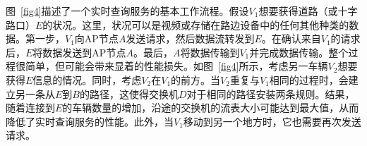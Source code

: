 
图~\ref{fig4}描述了一个实时查询服务的基本工作流程。假设$V_{1}$想要获得道路（或十字路口）$E$的状况。这里，状况可以是视频或存储在路边设备中的任何其他种类的数据。第一步，$V_{1}$向AP节点$A$发送请求，然后数据流转发到$E$。在确认来自$V_{1}$的请求后，$E$将数据发送到AP节点$A$。最后，$A$将数据传输到$V_{1}$并完成数据传输。整个过程很简单，但可能会带来显着的性能损失。如图~\ref{fig4}所示，考虑另一车辆$V_{2}$想要获得$E$信息的情况。同时，考虑$V_{2}$在$V_{1}$的前方。当$V_{2}$重复与$V_{1}$相同的过程时，会建立另一条从$E$到$B$的路径，这使得交换机$D$对于相同的路径安装两条规则。结果，随着连接到$E$的车辆数量的增加，沿途的交换机的流表大小可能达到最大值，从而降低了实时查询服务的性能。此外，当$V_{1}$移动到另一个地方时，它也需要再次发送请求。


